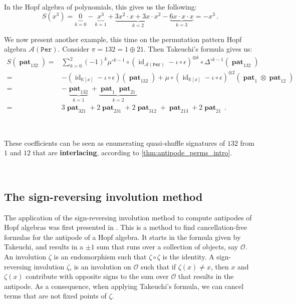 \documentclass[12pt, reqno]{amsart}
\theoremstyle{definition}
\DeclareMathOperator{\id}{id}
\DeclareMathOperator{\pat}{\mathbf{pat}}
\begin{document}
\

In the Hopf algebra of polynomials, this gives us the following:
$$S(x^3) = \underbrace{0}_{k = 0} - \underbrace{x^3}_{k = 1} + \underbrace{3 x^2 \cdot x + 3 x \cdot x^2}_{k=2} - \underbrace{6 x \cdot x \cdot x}_{k = 3} = - x^3 \, .$$


We now present another example, this time on the permutation pattern Hopf algebra $\mathcal A(\mathtt{Per})$.
Consider $\pi = 132 = 1 \oplus 21$. Then Takeuchi's formula gives us:
\begin{align*}
S(\pat_{132}) =& \sum_{k=0}^2 (-1)^k \mu^{\circ k-1} \circ (\id_{\mathcal A(\mathtt{Per})} - \iota \circ \epsilon)^{\otimes k} \circ \Delta^{\circ k-1}(\pat_{132})\\
=& -(\id_{\mathbb{K}[x]} - \iota \circ \epsilon)(\pat_{132}) + \mu \circ (\id_{\mathbb{K}[x]} - \iota\circ\epsilon)^{\otimes 2}(\pat_1 \otimes \pat_{12}) \\
=& - \underbrace{\pat_{132}}_{k=1} + \underbrace{\pat_1 \pat_{21}}_{k=2} \\
=& 3 \pat_{321} + 2 \pat_{231} + 2 \pat_{312} + \pat_{213} + 2 \pat_{21} \, .
\end{align*}

\

These coefficients can be seen as enumerating quasi-shuffle signatures of $132$ from $1$ and $12$ that are \textbf{interlacing}, according to \cref{thm:antipode_perms_intro}.



\

\subsection{The sign-reversing involution method}

The application of the sign-reversing involution method to compute antipodes of Hopf algebras was first presented in \cite{BS2017}.
This is a method to find cancellation-free formulas for the antipode of a Hopf algebra.
It starts in the formula given by Takeuchi, and results in a $\pm1$ sum that runs over a collection of objects, say $\mathcal O$.
An involution $\zeta $ is an endomorphism such that $\zeta \circ \zeta$ is the identity.
A sign-reversing involution $\zeta $, is an involution on $\mathcal O$ such that if $\zeta(x) \neq x$, then $x$ and $\zeta(x)$ contribute with opposite signs to the sum over $\mathcal O$ that results in the antipode.
As a consequence, when applying Takeuchi's formula, we can cancel terms that are not fixed points of $\zeta$.
\end{document}

